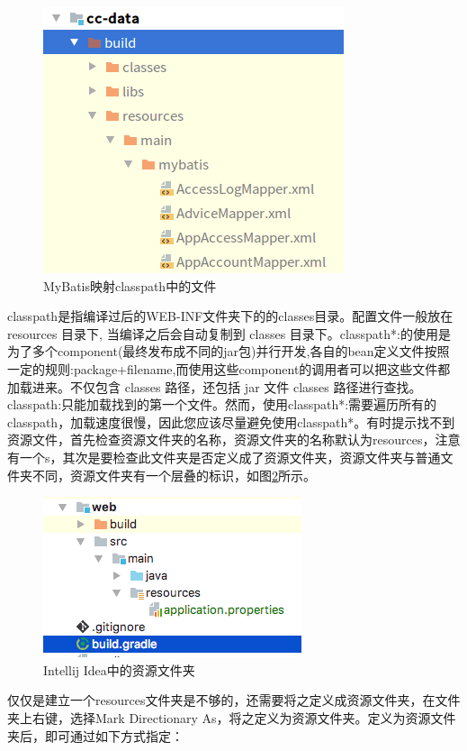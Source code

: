 \documentclass[letter]{book}
\begin{document}
\begin{figure}[htbp]
	\centering
	\includegraphics[scale=0.6]{classpathfile.png}
	\caption{MyBatis映射classpath中的文件}
	\label{fig:classpathfile}
\end{figure}

classpath是指编译过后的WEB-INF文件夹下的的classes目录。配置文件一般放在 resources 目录下, 当编译之后会自动复制到 classes 目录下。classpath*:的使用是为了多个component(最终发布成不同的jar包)并行开发,各自的bean定义文件按照一定的规则:package+filename,而使用这些component的调用者可以把这些文件都加载进来。不仅包含 classes 路径，还包括 jar 文件 classes 路径进行查找。classpath:只能加载找到的第一个文件。然而，使用classpath*:需要遍历所有的classpath，加载速度很慢，因此您应该尽量避免使用classpath*。有时提示找不到资源文件，首先检查资源文件夹的名称，资源文件夹的名称默认为resources，注意有一个s，其次是要检查此文件夹是否定义成了资源文件夹，资源文件夹与普通文件夹不同，资源文件夹有一个层叠的标识，如图\ref{fig:javaresourcefolder}所示。

\begin{figure}[htbp]
	\centering
	\includegraphics[scale=0.6]{javaresourcefolder.png}
	\caption{Intellij Idea中的资源文件夹}
	\label{fig:javaresourcefolder}
\end{figure}

仅仅是建立一个resources文件夹是不够的，还需要将之定义成资源文件夹，在文件夹上右键，选择Mark Directionary As，将之定义为资源文件夹。定义为资源文件夹后，即可通过如下方式指定：
\end{document}
